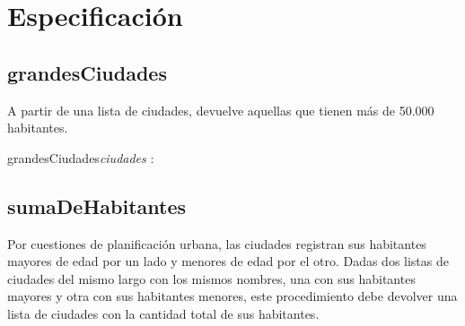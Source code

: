\documentclass[10pt,a4paper]{article}
\begin{document}

\maketitle

\section{Especificación}

\subsection{grandesCiudades}

A partir de una lista de ciudades, devuelve aquellas que tienen más de 50.000 habitantes.

\vspace{2mm}  %

\begin{proc}{grandesCiudades}{\In \textit{ciudades} : }{}
\end{proc}


\vspace{2mm}

{}

\vspace{4mm}

\subsection{sumaDeHabitantes}

Por cuestiones de planificación urbana, las ciudades registran sus habitantes mayores de edad por un lado y menores de edad por el otro. Dadas dos listas de ciudades del mismo largo con los mismos nombres, una con sus habitantes mayores y otra con sus habitantes menores, este procedimiento debe devolver una lista de ciudades con la cantidad total de sus habitantes.
\end{document}
